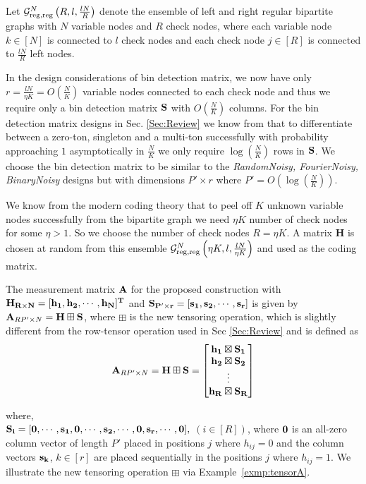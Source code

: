 \begin{definition}\label{def:leftandrighreg}
Let $\mathcal{G}^N_{\rm reg,reg}\left(R,l, \frac{lN}{R} \right)$ denote the ensemble of left and right regular bipartite graphs with $N$ variable nodes and $R$ check nodes, where each variable node $k \in [N]$ is connected to $l$ check nodes and each check node $j \in [R]$ is connected to $\frac{lN}{R}$ left nodes.
\end{definition}
In the design considerations of bin detection matrix, we now have only $r=\frac{lN}{\eta K}=O\left(\frac{N}{K}\right)$ variable nodes connected to each check node and thus we require only a bin detection matrix $\mathbf{S}$ with $O(\frac{N}{K})$ columns. For the bin detection matrix designs in Sec. \ref{Sec:Review} we know from \cite{li2015subdraft} that to differentiate between a zero-ton, singleton and a multi-ton successfully with probability approaching $1$ asymptotically in $\frac{N}{K}$ we only require $\log(\frac{N}{K})$ rows in $\mathbf{S}$. We choose the bin detection matrix to be similar to the \emph{RandomNoisy, FourierNoisy, BinaryNoisy} designs but with dimensions $P'\times r$ where $P'=O\left(\log(\frac{N}{K})\right)$.

We know from the modern coding theory that to peel off $K$ unknown variable nodes successfully from the bipartite graph we need $\eta K$ number of check nodes for some $\eta>1$. So we choose the number of check nodes $R = \eta K$. A matrix $\mathbf{H}$ is chosen at random from this ensemble $\mathcal{G}^N_{\rm reg,reg}\left(\eta K,l, \frac{lN}{\eta K} \right)$ and used as the coding matrix.

The measurement matrix $\bf A$ for the proposed construction with $\bf H_{R \times N} = [h_1, h_2, \cdots, h_N]^{T}$ and $\bf S_{P' \times r}= [s_1, s_2, \cdots ,s_r]$ is given by $ {\bf A}_{RP' \times N} = {\bf H \boxplus S }$,
 where $ \boxplus$ is the new tensoring operation, which is slightly different from the row-tensor operation used in Sec \ref{Sec:Review} and is defined as
  \[ {\bf A}_{RP' \times N} = {\bf H \boxplus S } = \begin{bmatrix} \bf
 h_1 \boxtimes S_1 \\ \bf
 h_2 \boxtimes S_2 \\ \bf
 \vdots\\ \bf
 h_R \boxtimes S_R  \bf
\end{bmatrix}  \]

 where, \\
 $\bf S_i= [0, \cdots, s_1 , 0, \cdots, s_2, \cdots, 0, s_r, \cdots, 0],$ $(i\in[R])$, where $\bf 0$ is an all-zero column vector of length $P'$ placed in positions $j$ where $h_{ij}=0$ and the column vectors $\bf s_k$, $k\in[r]$ are placed sequentially in the positions $j$ where $h_{ij}=1$.
We illustrate the new tensoring operation $\boxplus$ via Example~\ref{exmp:tensorA}.

